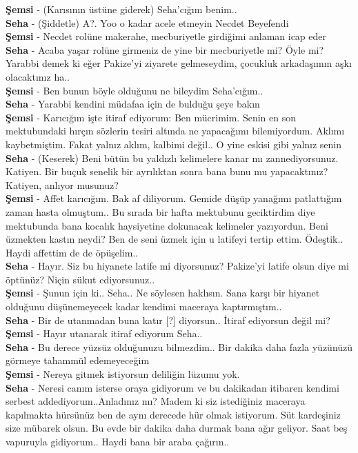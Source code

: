 \documentclass[]{book}
\begin{document}
\textbf{Şemsi} - (Karısının üstüne giderek) Seha'cığım benim..\\
\textbf{Seha} - (Şiddetle) A?. Yoo o kadar acele etmeyin Necdet Beyefendi\\
\textbf{Şemsi} - Necdet rolüne makerahe, mecburiyetle girdiğimi anlaman icap eder\\
\textbf{Seha} - Acaba yaşar rolüne girmeniz de yine bir mecburiyetle mi? Öyle mi? Yarabbi demek ki eğer Pakize'yi ziyarete gelmeseydim, çocukluk arkadaşımın aşkı olacaktınız ha..\\
\textbf{Şemsi} - Ben bunun böyle olduğunu ne bileydim Seha'cığım..\\
\textbf{Seha} - Yarabbi kendini müdafaa için de bulduğu şeye bakın\\
\textbf{Şemsi} - Karıcığım işte itiraf ediyorum: Ben mücrimim. Senin en son mektubundaki hırçın sözlerin tesiri altında ne yapacağımı bilemiyordum. Aklımı kaybetmiştim. Fakat yalnız aklım, kalbimi değil.. O yine eskisi gibi yalnız senin\\
\textbf{Seha} - (Keserek) Beni bütün bu yaldızlı kelimelere kanar mı zannediyorsunuz. Katiyen. Bir buçuk senelik bir ayrılıktan sonra bana bunu mu yapacaktınız? Katiyen, anlıyor musunuz?\\
\textbf{Şemsi} - Affet karıcığım. Bak af diliyorum. Gemide düşüp yanağımı patlattığım zaman hasta olmuştum.. Bu sırada bir hafta mektubunu geciktirdim diye mektubunda bana kocalık haysiyetine dokunacak kelimeler yazıyordun. Beni üzmekten kastın neydi? Ben de seni üzmek için u latifeyi tertip ettim. Ödeştik.. Haydi affettim de de öpüşelim..\\
\textbf{Seha} - Hayır. Siz bu hiyanete latife mi diyorsunuz? Pakize'yi latife olsun diye mi öptünüz? Niçin sükut ediyorsunuz..\\
\textbf{Şemsi} - Şunun için ki.. Seha.. Ne söylesen haklısın. Sana karşı bir hiyanet olduğunu düşünemeyecek kadar kendimi maceraya kaptırmıştım..\\
\textbf{Seha} - Bir de utanmadan buna katır {[}?{]} diyorsun.. İtiraf ediyorsun değil mi?\\
\textbf{Şemsi} - Hayır utanarak itiraf ediyorum Seha..\\
\textbf{Seha} - Bu derece yüzsüz olduğunuzu bilmezdim.. Bir dakika daha fazla yüzünüzü görmeye tahammül edemeyeceğim\\
\textbf{Şemsi} - Nereya gitmek istiyorsun deliliğin lüzumu yok.\\
\textbf{Seha} - Neresi canım isterse oraya gidiyorum ve bu dakikadan itibaren kendimi serbest addediyorum..Anladınız mı? Madem ki siz istediğiniz maceraya kapılmakta hürsünüz ben de aynı derecede hür olmak istiyorum. Süt kardeşiniz size mübarek olsun. Bu evde bir dakika daha durmak bana ağır geliyor. Saat beş vapuruyla gidiyorum.. Haydi bana bir araba çağırın..\\
\end{document}
